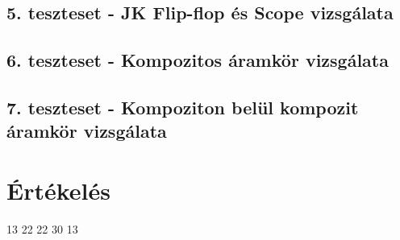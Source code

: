 \subsection{5. teszteset - JK Flip-flop és Scope vizsgálata}

\subsection{6. teszteset - Kompozitos áramkör vizsgálata}

\subsection{7. teszteset - Kompoziton belül kompozit áramkör vizsgálata}












\section{Értékelés}

\begin{ertekeles}
{13}        %
{22}
{22}
{30}
{13}
\end{ertekeles}

